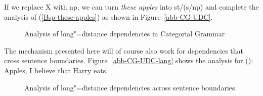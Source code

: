 If we replace X with np, we can turn \emph{these apples} into st/(s/np) and complete the analysis of 
(\ref{Bsp-these-apples}) as shown in Figure~\vref{abb-CG-UDC}.
\begin{figure}
\centerline{%
}
\caption{\label{abb-CG-UDC}Analysis of long"=distance dependencies in Categorial Grammar}
\end{figure}%
%
The mechanism presented here will of course also work for dependencies that cross sentence boundaries.
Figure~\vref{abb-CG-UDC-lang} shows the analysis for ():
\ea
Apples, I believe that Harry eats.
\z
\begin{figure}
\centerline{%
}
\caption{\label{abb-CG-UDC-lang}Analysis of long"=distance dependencies across sentence boundaries}
\end{figure}%
